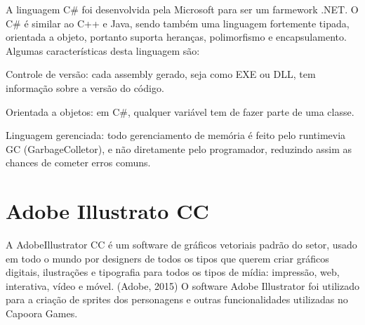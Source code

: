 A linguagem C\# foi desenvolvida pela Microsoft para ser um farmework .NET. 
O C\# é similar ao C++ e Java, sendo também uma linguagem fortemente tipada, orientada a objeto, portanto suporta heranças, polimorfismo e encapsulamento. 
Algumas características desta linguagem são: 

\begin{alineascomponto}
	\item Controle de versão: cada assembly gerado, seja como EXE ou DLL, tem informação sobre a versão do código. 

	\item Orientada a objetos: em C\#, qualquer variável tem de fazer parte de uma classe.  

	\item Linguagem gerenciada: todo gerenciamento de memória é feito pelo runtimevia GC (GarbageColletor), e não diretamente pelo programador, reduzindo assim as chances de cometer erros comuns.
\end{alineascomponto}

\section{Adobe Illustrato CC}
\label{sec:Adobe-Illustrato-CC}

A AdobeIllustrator CC é um software de gráficos vetoriais padrão do setor, usado em todo o mundo por designers de todos os tipos que querem criar gráficos digitais, ilustrações e tipografia para todos os tipos de mídia: impressão, web, interativa, vídeo e móvel. (Adobe, 2015)
O software Adobe Illustrator foi utilizado para a criação de sprites dos personagens e outras funcionalidades utilizadas no Capoora Games.

\begin{figure}[h!]
		\centering
	\end{figure}
	
